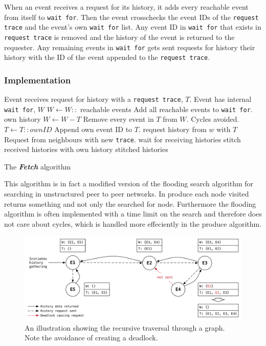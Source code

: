 	When an event receives a request for its history, it adds every reachable event from itself to \texttt{wait for}. Then the event crosschecks the event IDs of the \texttt{request trace} and the event's own \texttt{wait for} list. Any event ID in \texttt{wait for} that exists in \texttt{request trace} is removed and the history of the event is returned to the requester. Any remaining events in \texttt{wait for} gets sent requests for history their history with the ID of the event appended to the \texttt{request trace}. 
	
	\subsubsection{Implementation}
	\begin{algorithm}
	\begin{algorithmic}
		\State Event receives request for history with a \texttt{request trace}, $T$.
		\State Event has internal \texttt{wait for}, $W$
		\State
		\State $W\gets W::$ reachable events \Comment Add all reachable events to \texttt{wait for}.
			\Return own history
		\Else
			\State $W\gets W-T$ \Comment Remove every event in $T$ from $W$. Cycles avoided.
			\State $T\gets T::ownID$ \Comment Append own event ID to $T$.
			\State
				\State request history from $w$ with $T$ \Comment Request from neighbours with new \texttt{trace}.
			\EndFor
			\State wait for receiving histories
			\State stitch received histories with own history
			\State
			\Return stitched histories
		\EndIf
	\end{algorithmic}
	\caption{The \textit{\textbf{Fetch}} algorithm}
	\label{alg:fetch}
	\end{algorithm}
	
	\newpar This algorithm is in fact a modified version of the flooding search algorithm for searching in unstructured peer to peer networks. In produce each node visited returns something and not only the searched for node. Furthermore the flooding algorithm is often implemented with a time limit on the search and therefore does not care about cycles, which is handled more effeciently in the produce algorithm.
	
	\begin{figure}[H]
		\centering
		\includegraphics[width=\textwidth]{4connect/images/recursive.pdf}
		\caption{An illustration showing the recursive traversal through a graph. Note the avoidance of creating a deadlock.}
		\label{fig:connecting:recursive}
	\end{figure}
	
